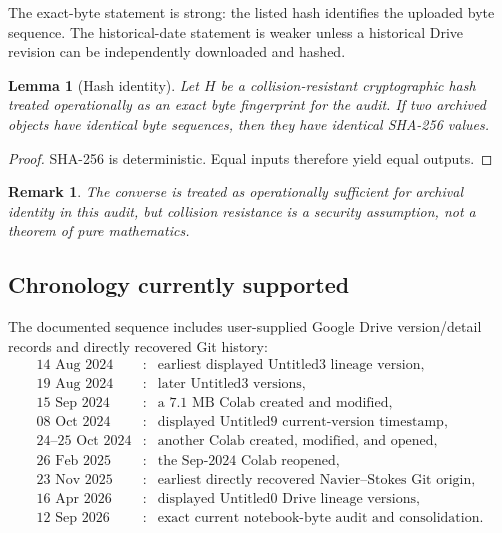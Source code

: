 \documentclass[11pt]{article}
\newtheorem{lemma}[theorem]{Lemma}
\newtheorem{remark}[theorem]{Remark}
\begin{document}
The exact-byte statement is strong: the listed hash identifies the uploaded byte sequence. The historical-date statement is weaker unless a historical Drive revision can be independently downloaded and hashed.

\begin{lemma}[Hash identity]
Let $H$ be a collision-resistant cryptographic hash treated operationally as an exact byte fingerprint for the audit. If two archived objects have identical byte sequences, then they have identical SHA-256 values.
\end{lemma}
\begin{proof}SHA-256 is deterministic. Equal inputs therefore yield equal outputs.\end{proof}

\begin{remark}The converse is treated as operationally sufficient for archival identity in this audit, but collision resistance is a security assumption, not a theorem of pure mathematics.\end{remark}

\subsection{Chronology currently supported}
The documented sequence includes user-supplied Google Drive version/detail records and directly recovered Git history:
\[
\begin{array}{rcl}
14\text{ Aug }2024 &:& \text{earliest displayed Untitled3 lineage version},\\
19\text{ Aug }2024 &:& \text{later Untitled3 versions},\\
15\text{ Sep }2024 &:& \text{a 7.1 MB Colab created and modified},\\
08\text{ Oct }2024 &:& \text{displayed Untitled9 current-version timestamp},\\
24\text{--}25\text{ Oct }2024 &:& \text{another Colab created, modified, and opened},\\
26\text{ Feb }2025 &:& \text{the Sep-2024 Colab reopened},\\
23\text{ Nov }2025 &:& \text{earliest directly recovered Navier--Stokes Git origin},\\
16\text{ Apr }2026 &:& \text{displayed Untitled0 Drive lineage versions},\\
12\text{ Sep }2026 &:& \text{exact current notebook-byte audit and consolidation}.
\end{array}
\]
\end{document}
